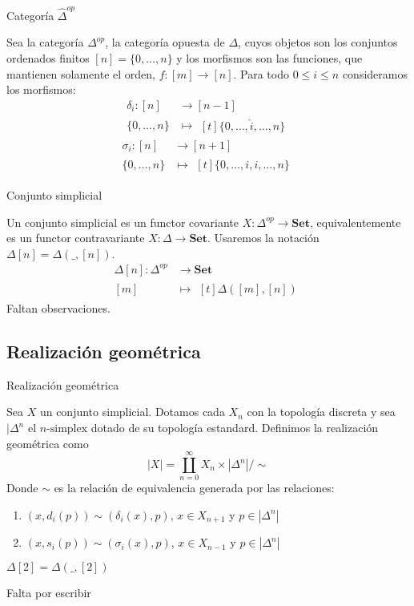 \documentclass[../main.tex]{subfiles}
\begin{document}
\begin{defi}
    Categor\'ia $\hat{\Delta}^{op}$
\end{defi}
Sea la categor\'ia $\Delta^{op}$, la categor\'ia opuesta de $\Delta$, cuyos objetos son los conjuntos ordenados finitos $[n] = \{0,\dots,n\}$ y los morfismos son las funciones, que mantienen solamente el orden, $f: [m] \longrightarrow [n]$.
Para todo $0\le i \le n$ consideramos los morfismos:
\begin{align*}
    \delta_i: [n] & \longrightarrow [n-1] \\
    \{0,\dots,n\} & \longmapsto\!
    \begin{aligned}[t]
        \{0,\dots, \hat{i}, \dots,n\}
    \end{aligned}
\end{align*}
\begin{align*}
    \sigma_i: [n] & \longrightarrow [n+1] \\
    \{0,\dots,n\} & \longmapsto\!
    \begin{aligned}[t]
        \{0,\dots, i,i, \dots,n\}
    \end{aligned}
\end{align*}

\begin{defi}
    Conjunto simplicial
\end{defi}
Un conjunto simplicial es un functor covariante $X: \Delta^{op} \longrightarrow \mathbf{Set}$, equivalentemente es un functor contravariante $X: \Delta \longrightarrow \mathbf{Set}$.
Usaremos la notaci\'on $\Delta[n]=\Delta(\_,[n])$.
\begin{align*}
    \Delta[n]: \Delta^{op} & \longrightarrow \mathbf{Set} \\
    [m]                    & \longmapsto\!
    \begin{aligned}[t]
        \Delta([m],[n])
    \end{aligned}
\end{align*}
Faltan observaciones.

\subsection{Realizaci\'on geom\'etrica}
\begin{defi}
    Realizaci\'on geom\'etrica
\end{defi}
Sea $X$ un conjunto simplicial. Dotamos cada $X_n$ con la topolog\'ia discreta y sea $|\Delta^n$ el $n\text{-simplex}$ dotado de su topolog\'ia estandard. Definimos la realizaci\'on geom\'etrica como
$$
    |X| = \coprod_{n=0}^{\infty}X_n \times |\Delta^n| / \sim
$$
Donde $\sim$ es la relaci\'on de equivalencia generada por las relaciones:

\begin{enumerate}[(1)]
    \item $(x, d_i(p)) \sim (\delta_i(x), p)$, $x\in X_{n+1}$ y $p\in|\Delta^n|$
    \item $(x, s_i(p)) \sim (\sigma_i(x), p)$, $x\in X_{n-1}$ y $p\in|\Delta^n|$
\end{enumerate}

\begin{ex}
    $\Delta[2] = \Delta(\_, [2])$
\end{ex}
Falta por escribir
\end{document}
